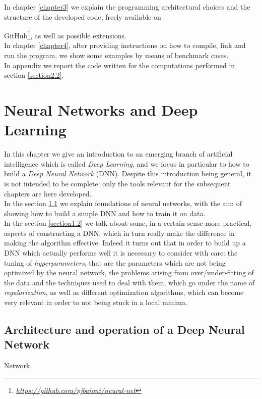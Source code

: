 \documentclass[12pt, a4paper]{report}
\theoremstyle{definition}
\begin{document}
In chapter \ref{chapter3} we explain the programming architectural choices and the structure of the developed code, freely available on {GitHub\footnote{\href{https://github.com/pjbaioni/neural-net}{\emph{https://github.com/pjbaioni/neural-net}}}, as well as possible extensions.\\
In chapter \ref{chapter4}, after providing instructions on how to compile, link and run the program, we show some examples by means of benchmark cases.\\
In appendix we report the \cite{freefem++} code written for the computations performed in section \ref{section2.2}.




\chapter{Neural Networks and Deep Learning}\label{chapter1}
In this chapter we give an introduction to an emerging branch of artificial intelligence which is called \textit{Deep Learning}, and we focus in particular to how to build a \textit{Deep Neural Network} (DNN). Despite this introduction being general, it is not intended to be complete: only the tools relevant for the subsequent chapters are here developed.\\
In the section \ref{section1.1} we explain foundations of neural networks, with the aim of showing how to build a simple DNN and how to train it on data.\\
In the section \ref{section1.2} we talk about some, in a certain sense more practical, aspects of constructing a DNN, which in turn really make the difference in making the algorithm effective. Indeed it turns out that in order to build up a DNN which actually performs well it is necessary to consider with care: the tuning of \textit{hyperparameters}, that are the parameters which are not being optimized by the neural network, the problems arising from over/under-fitting of the data and the techniques used to deal with them, which go under the name of \textit{regularization}, as well as different optimization algorithms, which can become very relevant in order to not being stuck in a local minima.\\

\section{Architecture and operation of a Deep Neural Network}\label{section1.1}
Network}\label{section1.1}
\end{document}
